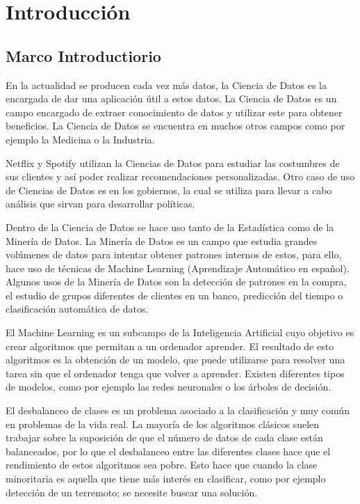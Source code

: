 \chapter{Introducción}
\section{Marco Introductiorio}
En la actualidad se producen cada vez más datos, la Ciencia de Datos es la encargada de dar una aplicación útil a estos datos. La Ciencia de Datos es un campo encargado de extraer conocimiento de datos y utilizar este para obtener beneficios. La Ciencia de Datos se encuentra en muchos otros campos como por ejemplo la Medicina o la Industria.\newline

Netflix y Spotify utilizan la Ciencias de Datos para estudiar las costumbres de sus clientes y así poder realizar recomendaciones personalizadas. Otro caso de uso de Ciencias de Datos es en los gobiernos, la cual se utiliza para llevar a cabo análisis que sirvan para desarrollar políticas.\newline

Dentro de la Ciencia de Datos se hace uso tanto de la Estadística como de la Minería de Datos. La Minería de Datos es un campo que estudia grandes volúmenes de datos para intentar obtener patrones internos de estos, para ello, hace uso de técnicas de Machine Learning (Aprendizaje Automático en español). Algunos usos de la Minería de Datos son la detección de patrones en la compra, el estudio de grupos diferentes de clientes en un banco, predicción del tiempo o clasificación automática de datos.\newline

El Machine Learning es un subcampo de la Inteligencia Artificial cuyo objetivo es crear algoritmos que permitan a un ordenador aprender. El resultado de esto algoritmos es la obtención de un modelo, que puede utilizarse para resolver una tarea sin que el ordenador tenga que volver a aprender. Existen diferentes tipos de modelos, como por ejemplo las redes neuronales o los árboles de decisión.\newline

El desbalanceo de clases es un problema asociado a la clasificación y muy común en problemas de la vida real. La mayoría de los algoritmos clásicos suelen trabajar sobre la suposición de que el número de datos de cada clase están balanceados, por lo que el desbalanceo entre las diferentes clases hace que el rendimiento de estos algoritmos sea pobre. Esto hace que cuando la clase minoritaria es aquella que tiene más interés en clasificar, como por ejemplo detección de un terremoto; se necesite buscar una solución.\newline

